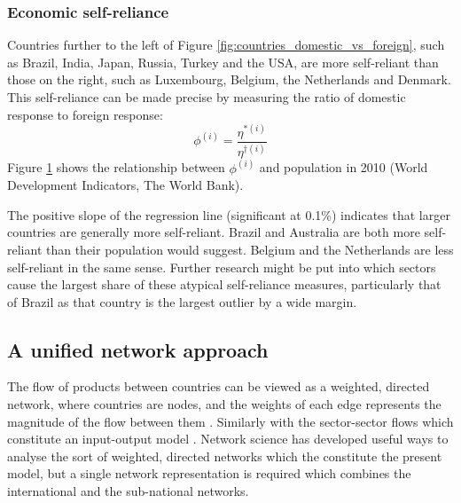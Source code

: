\documentclass[a4paper]{article}
\begin{document}
\subsubsection*{Economic self-reliance}
Countries further to the left of Figure \ref{fig:countries_domestic_vs_foreign}, such as Brazil, India, Japan, Russia, Turkey and the USA, are more self-reliant than those on the right, such as Luxembourg, Belgium, the Netherlands and Denmark.
This self-reliance can be made precise by measuring the ratio of domestic response to foreign response:
\begin{equation}
\phi^{(i)} = \frac{\eta^{*(i)}}{\eta^{\dagger(i)}}
\end{equation}
Figure \ref{fig:phi-vs-pop} shows the relationship between $\phi^{(i)}$ and population in 2010 (World Development Indicators, The World Bank).

The positive slope of the regression line (significant at 0.1\%) indicates that larger countries are generally more self-reliant.
Brazil and Australia are both more self-reliant than their population would suggest.
Belgium and the Netherlands are less self-reliant in the same sense.
Further research might be put into which sectors cause the largest share of these atypical self-reliance measures, particularly that of Brazil as that country is the largest outlier by a wide margin.

\begin{figure}[tb]
\centering
\caption{}
\label{fig:phi-vs-pop}
\end{figure}

\subsection{A unified network approach}
The flow of products between countries can be viewed as a weighted, directed network, where countries are nodes, and the weights of each edge represents the magnitude of the flow between them \parencite{nystuen_graph_1961,serrano_topology_2003,bhattacharya_international_2008,baskaran_heckscher-ohlin_2011}.
Similarly with the sector-sector flows which constitute an input-output model \parencite{blochl_vertex_2011,fedriani_simplifying_2012}.
Network science has developed useful ways to analyse the sort of weighted, directed networks which the constitute the present model, but a single network representation is required which combines the international and the sub-national networks.
\end{document}
